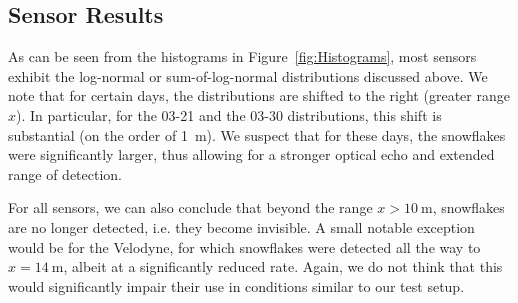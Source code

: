 \subsection{Sensor Results}
As can be seen from the histograms in Figure~\ref{fig:Histograms}, most sensors exhibit the log-normal or sum-of-log-normal distributions discussed above. We note that for certain days, the distributions are shifted to the right (greater range $x$). In particular, for the 03-21 and the 03-30 distributions, this shift is substantial (on the order of \SI{1}{\meter}). We suspect that for these days, the snowflakes were significantly larger, thus allowing for a stronger optical echo and extended range of detection.

For all sensors, we can also conclude that beyond the range $x>\SI{10}{\meter}$, snowflakes are no longer detected, i.e. they become invisible. A small notable exception would be for the Velodyne, for which snowflakes were detected all the way to $x=\SI{14}{\meter}$, albeit at a significantly reduced rate. Again, we do not think that this would significantly impair their use in conditions similar to our test setup.

